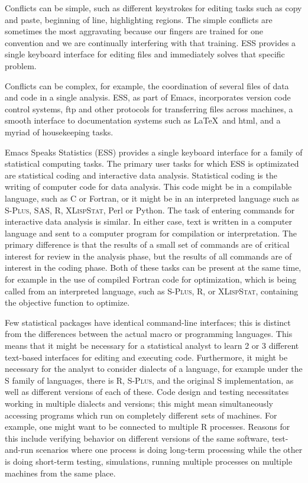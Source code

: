 \documentclass{article}
\newcommand*{\Splus}{\textsc{S-Plus}}
\newcommand*{\XLispStat}{\textsc{XLispStat}}
\begin{document}
Conflicts can be simple, such as different keystrokes for editing
tasks such as copy and paste, beginning of line, highlighting
regions. The simple conflicts are sometimes the most aggravating
because our fingers are trained for one convention and we are
continually interfering with that training.
ESS provides a single keyboard interface for editing files and
immediately solves that specific problem.


Conflicts can be complex, for example, the coordination of several
files of data and code in a single analysis.  ESS, as part of Emacs,
incorporates version code control systems, ftp and other protocols for
transferring files across machines, a smooth interface to
documentation systems such as \LaTeX\ and html, and a myriad of
housekeeping tasks.

Emacs Speaks Statistics (ESS) provides a single keyboard interface for
a family of statistical computing tasks.  The primary user tasks for
which ESS is optimizated are statistical coding and interactive data
analysis.  Statistical coding is the writing of computer code for data
analysis.  This code might be in a compilable language, such as C or
Fortran, or it might be in an interpreted language such as \Splus,
SAS, R, \XLispStat, Perl or Python.  The task of entering commands for
interactive data analysis is similar.  In either case, text is written
in a computer language and sent to a computer program for compilation
or interpretation.  The primary difference is that the results of a
small set of commands are of critical interest for review in the
analysis phase, but the results of all commands are of interest in the
coding phase.  Both of these tasks can be present at the same time,
for example in the use of compiled Fortran code for optimization,
which is being called from an interpreted language, such as \Splus, R,
or \XLispStat, containing the objective function to optimize.

Few statistical packages have identical command-line interfaces; this
is distinct from the differences between the actual macro or
programming languages.  This means that it might be necessary for a
statistical analyst to learn 2 or 3 different text-based interfaces
for editing and executing code.  Furthermore, it might be necessary
for the analyst to consider dialects of a language, for example under
the S family of languages, there is R, \Splus, and the original S
implementation, as well as different versions of each of these.  Code
design and testing necessitates working in multiple dialects and
versions; this might mean simultaneously accessing programs which run
on completely different sets of machines.  For example, one might want
to be connected to multiple R processes.  Reasons for this include
verifying behavior on different versions of the same software,
test-and-run scenarios where one process is doing long-term processing
while the other is doing short-term testing, simulations, running
multiple processes on multiple machines from the same place.
\end{document}
